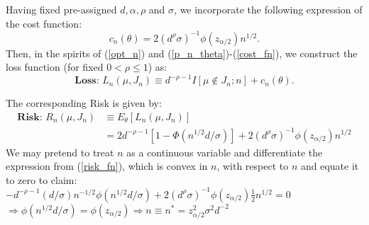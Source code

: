 \documentclass [xcolor=svgnames, t] {beamer}
\begin{document}
\begin{frame}{}
\vspace{10mm}
Having fixed pre-assigned $d,\alpha,\rho$ and $\sigma$, we incorporate the 
following expression of the cost function:
        \begin{equation} \label{cost_fn}
        c_n(\theta) = 2(d^\rho \sigma)^{-1} \phi(z_{\alpha/2})n^{1/2}.
        \end{equation}
Then, in the spirits of (\ref{opt_n}) and (\ref{p_n_theta})-(\ref{cost_fn}), we construct the loss function (for fixed $0<\rho \le 1$) as:
        \begin{equation} \label{loss2}
            \textbf{Loss: }L_n(\mu,J_n) \equiv d^{-\rho-1}I[\mu \not\in J_n;n]+c_n(\theta).
        \end{equation}

\end{frame}

\begin{frame}{}
\vspace{10mm}

The corresponding Risk is given by:
    \begin{equation} \label{risk_fn}
    \begin{split}
        \textbf{Risk: } R_n(\mu,J_n)  
        & \equiv E_{\theta}[L_n(\mu,J_n)] \\ 
        &= 2d^{-\rho-1}[1-\Phi(n^{1/2}d/\sigma)]+2(d^{\rho}\sigma)^{-1}\phi(z_{\alpha/2})n^{1/2} 
    \end{split}
    \end{equation}
We may pretend to treat $n$ as a continuous variable 
and differentiate the expression from (\ref{risk_fn}), 
which is convex in $n$, with respect to $n$ and equate it to zero to claim:\\
    $-d^{-\rho-1}(d/\sigma)n^{-1/2}\phi(n^{1/2}d/\sigma)+
    2(d^\rho \sigma)^{-1}\phi(z_{\alpha/2})\frac{1}{2} n^{1/2}=0$\\
    \vspace{0.1cm}
    $\Rightarrow \phi(n^{1/2}d/\sigma)=\phi(z_{\alpha/2}) \Rightarrow  n \equiv n^*=z^2_{\alpha/2}\sigma^2d^{-2}$
    
\end{frame}
\end{document}
